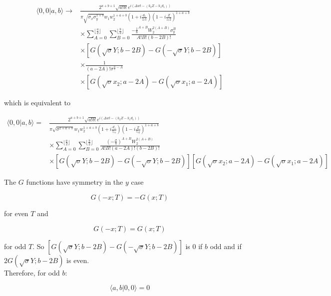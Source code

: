 \documentclass[aps,twoside,secnumarabic,balancelastpage,amsmath,amssymb,nofootinbib,hyperref=pdftex]{revtex4}
\begin{document}
\begin{align*}
	\langle 0,0 | a,b \rangle
	\rightarrow &
	\frac
	{
		2^{a+b+1}
		\sqrt{a!b!}
		e^{i(\Delta w t 
		- (k_2 Z - k_1d_1)
		)}
	}
	{
		\pi \sqrt{\sigma_x \sigma_y^{1+b}}
		w_1 w_2^{1+a+b}
		(1+i \frac{d_1}{z_r1})
		(1-i \frac{Z}{z_r2})^{1+a+b}
	}
	\\& \times
	\sum_{A=0}^{\lfloor{\frac{a}{2}} \rfloor}
	\sum_{B=0}^{\lfloor{\frac{b}{2}} \rfloor}
	\frac
	{
		-\frac{1}{8}^{A+B}
		W_2^{2(A+B)}
		\sigma_y^B		
	}
	{
		A!B!(b-2B)!
	}
	\\& \times
	[
		G(\sqrt{\sigma}Y;b-2B)
		-
		G(-\sqrt{\sigma}Y;b-2B)		
	]
	\\& \times
	\frac{1}{(a-2A)!\sigma^{\frac{a}{2}-A}}
	\\& \times
	[
		G(\sqrt{\sigma}x_2;a-2A)
		-
		G(\sqrt{\sigma}x_1;a-2A)			
	]
\end{align*}

which is equivalent to 

\begin{align*}
 \langle 0,0 | a,b \rangle =&
 	\frac
 	{
 		2^{a+b+1}
 		\sqrt{a!b!}
 		e^{i(\Delta w t 
			- (k_2 Z - k_1d_1)
		)}
 	}
 	{
 		\pi \sqrt{\sigma^{2+a+b}}
 		w_1 w_2^{1+a+b}
 		(1+i \frac{d_1}{z_{r1}})
 		(1-i \frac{Z}{z_{r2}})^{1+a+b}	
 	}
 	\\& \times
		\sum_{A=0}^{\lfloor{\frac{a}{2}} \rfloor}
		\sum_{B=0}^{\lfloor{\frac{b}{2}} \rfloor}
		\frac
		{
			(-\frac{\sigma}{8})^{A+B}
			W_2^{2(A+B)}	
		}
		{
			A!B! (a-2A)!(b-2B)!
		}
 	\\& \times
 		[
		G(\sqrt{\sigma}Y;b-2B)
		-
		G(-\sqrt{\sigma}Y;b-2B)		
	]
	[
		G(\sqrt{\sigma}x_2;a-2A)
		-
		G(\sqrt{\sigma}x_1;a-2A)			
	]
\end{align*}

The $G$ functions have symmetry in the $y$ case

\begin{equation*}
	G(-x;T) = -G(x;T)
\end{equation*}

for even $T$ and 

\begin{equation*}
	G(-x;T) = G(x;T)
\end{equation*}

for odd $T$. So $ 		[
		G(\sqrt{\sigma}Y;b-2B)
		-
		G(-\sqrt{\sigma}Y;b-2B)		
	]$ is 0 if $b$ odd and if $2G(\sqrt{\sigma}Y;b-2B)$ is even.\\ 
Therefore, for odd $b$:

\begin{equation*}
	\langle a,b| 0,0 \rangle=0
\end{equation*}
\end{document}
